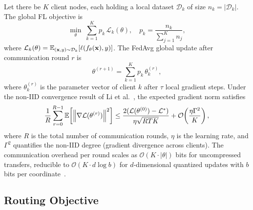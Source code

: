 Let there be $K$ client nodes, each holding a local dataset $\mathcal{D}_k$
of size $n_k = |\mathcal{D}_k|$.
The global FL objective is
\begin{equation}
  \min_{\theta}\; \sum_{k=1}^{K} p_k\, \mathcal{L}_k(\theta),
  \quad p_k = \frac{n_k}{\sum_{j=1}^{K} n_j},
  \label{eq:fl_obj}
\end{equation}
where
$\mathcal{L}_k(\theta) = \mathbb{E}_{(\mathbf{x},y)\sim\mathcal{D}_k}
[\ell(f_\theta(\mathbf{x}), y)]$.
The FedAvg global update after communication round $r$ is
\begin{equation}
  \theta^{(r+1)} = \sum_{k=1}^{K} p_k\, \theta_k^{(r)},
  \label{eq:fedavg}
\end{equation}
where $\theta_k^{(r)}$ is the parameter vector of client $k$ after $\tau$
local gradient steps.
Under the non-IID convergence result of Li et al.\
\cite{li2020fedavg_convergence}, the expected gradient norm satisfies
\begin{equation}
  \frac{1}{R}\sum_{r=0}^{R-1}
  \mathbb{E}\!\left[\left\lVert\nabla \mathcal{L}(\theta^{(r)})\right\rVert^2\right]
  \leq
  \frac{2(\mathcal{L}(\theta^{(0)}) - \mathcal{L}^*)}
       {\eta\sqrt{RTK}}
  + \mathcal{O}\!\left(\frac{\eta\Gamma^2}{K}\right),
  \label{eq:fl_convergence}
\end{equation}
where $R$ is the total number of communication rounds, $\eta$ is the
learning rate, and $\Gamma^2$ quantifies the non-IID degree (gradient
divergence across clients).
The communication overhead per round scales as
$\mathcal{O}(K \cdot |\theta|)$ bits for uncompressed transfers, reducible
to $\mathcal{O}(K \cdot d \log b)$ for $d$-dimensional quantized updates
with $b$ bits per coordinate~\cite{kairouz2021advances}.

\subsection{Routing Objective}

